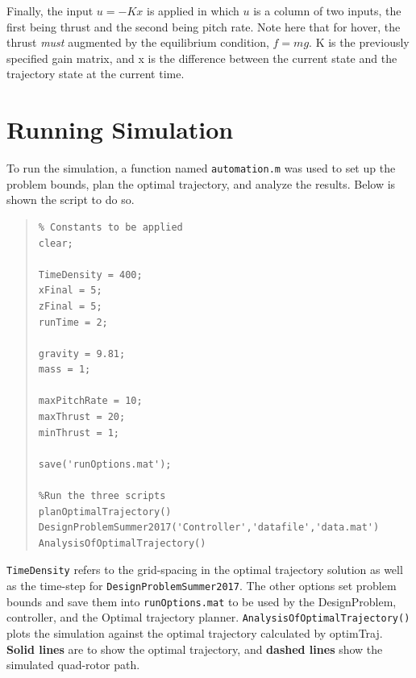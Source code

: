 \documentclass[12pt]{article}
\begin{document}
Finally, the input $u = -Kx$ is applied in which $u$ is a column of two inputs, the first being thrust and the second being pitch rate.  Note here that for hover, the thrust \textit{must} augmented by the equilibrium condition, $f = mg$.  K is the previously specified gain matrix, and x is the difference between the current state and the trajectory state at the current time.

\section{Running Simulation}\label{Running Simulation}

To run the simulation, a function named \lstinline!automation.m! was used to set up the problem bounds, plan the optimal trajectory, and analyze the results. Below is shown the script to do so.
\begin{quote}
\begin{lstlisting}
% Constants to be applied
clear; 

TimeDensity = 400;
xFinal = 5;
zFinal = 5;
runTime = 2;

gravity = 9.81;
mass = 1;

maxPitchRate = 10;
maxThrust = 20;
minThrust = 1;

save('runOptions.mat');

%Run the three scripts
planOptimalTrajectory()
DesignProblemSummer2017('Controller','datafile','data.mat')
AnalysisOfOptimalTrajectory()

\end{lstlisting}
\end{quote}
\lstinline!TimeDensity! refers to the grid-spacing in the optimal trajectory solution as well as the time-step for \lstinline!DesignProblemSummer2017!. The other options set problem bounds and save them into \lstinline!runOptions.mat! to be used by the DesignProblem, controller, and the Optimal trajectory planner. 
\newline
\newline
\lstinline!AnalysisOfOptimalTrajectory()! plots the simulation against the optimal trajectory calculated by optimTraj. \textbf{Solid lines} are to show the optimal trajectory, and \textbf{dashed lines} show the simulated quad-rotor path.
\end{document}
